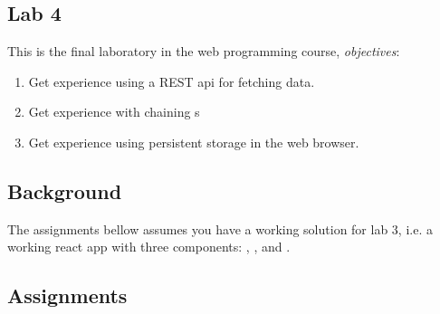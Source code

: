 \documentclass[fleqn, article, a4paper]{memoir}
\begin{document}
\maketitle
\thispagestyle{titlepage}
\vspace{-4cm}

\subsection*{Lab 4}

\n This is the final laboratory in the web programming course, \emph{objectives}:

\begin{enumerate}\firmlist
\item Get experience using a REST api for fetching data.
\item Get experience with chaining s
\item Get experience using persistent storage in the web browser.
\end{enumerate}

\subsection*{Background}

The assignments bellow assumes you have a working solution for lab 3, i.e. a working react app with three components: , , and .

\subsection*{Assignments}
\end{document}
